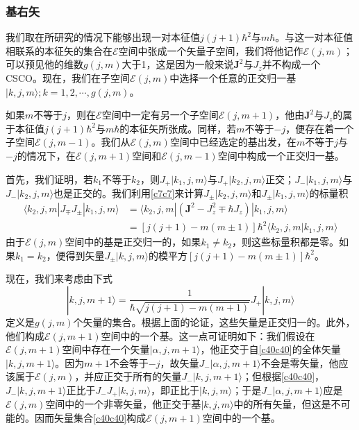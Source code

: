 \documentclass[]{article}
\begin{document}
\subsubsection{基右矢}
我们取在所研究的情况下能够出现一对本征值$j(j+1)\hbar^2$与$m\hbar$。与这一对本征值相联系的本征矢的集合在$\mathscr{E}$空间中张成一个矢量子空间，我们将他记作$\mathscr{E}(j,m)$；可以预见他的维数$g(j,m)$大于1，这是因为一般来说$\boldsymbol{J}^2$与$J_z$并不构成一个CSCO。现在，我们在子空间$\mathscr{E}(j,m)$中选择一个任意的正交归一基${|k,j,m\rangle;k=1,2,\cdots,g(j,m)}$。\par 
如果$m$不等于$j$，则在$\mathscr{E}$空间中一定有另一个子空间$\mathscr{E}(j,m+1)$，他由$\boldsymbol{J}^2$与$J_z$的属于本征值$j(j+1)\hbar^2$与$m\hbar$的本征矢所张成。同样，若$m$不等于$-j$，便存在着一个子空间$\mathscr{E}(j,m-1)$。我们从$\mathscr{E}(j,m)$空间中已经选定的基出发，在$m$不等于$j$与$-j$的情况下，在$\mathscr{E}(j,m+1)$空间和$\mathscr{E}(j,m-1)$空间中构成一个正交归一基。\par 
首先，我们证明，若$k_1$不等于$k_2$，则$J_+|k_1,j,m\rangle$与$J_+|k_2,j,m\rangle$正交；$J_-|k_1,j,m\rangle$与$J_-|k_2,j,m\rangle$也是正交的。我们利用\eqref{c7c7}来计算$J_{\pm}|k_2,j,m\rangle$和$J_{\pm}|k_1,j,m\rangle$的标量积
\begin{align}
	\langle k_2,j,m|J_{\mp}J_{\pm}|k_1,j,m\rangle&=\langle k_2,j,m|(\boldsymbol{J}^2-J_z^2\mp\hbar J_z)|k_1,j,m\rangle\nonumber\\
	&=[j(j+1)-m(m\pm1)]\hbar^2\langle k_2,j,m|k_1,j,m\rangle
\end{align}
由于$\mathscr{E}(j,m)$空间中的基是正交归一的，如果$k_1\neq k_2$，则这些标量积都是零。如果$k_1=k_2$，便得到矢量$J_{\pm}|k,j,m\rangle$的模平方$[j(j+1)-m(m\pm1)]\hbar^2$。\par 
现在，我们来考虑由下式
\begin{equation}
	|k,j,m+1\rangle=\dfrac{1}{\hbar\sqrt{j(j+1)-m(m+1)}}J_+|k,j,m\rangle
	\label{c40c40}
\end{equation}
定义是$g(j,m)$个矢量的集合。根据上面的论证，这些矢量是正交归一的。此外，他们构成$\mathscr{E}(j,m+1)$空间中的一个基。这一点可证明如下：我们假设在$\mathscr{E}(j,m+1)$空间中存在一个矢量$|\alpha,j,m+1\rangle$，他正交于自\eqref{c40c40}的全体矢量$|k,j,m+1\rangle$。因为$m+1$不会等于$-j$，故矢量$J_-|\alpha,j,m+1\rangle$不会是零矢量，他应该属于$\mathscr{E}(j,m)$，并应正交于所有的矢量$J_-|k,j,m+1\rangle$；但根据\eqref{c40c40}，$J_-|k,j,m+1\rangle$正比于$J_-J_+|k,j,m\rangle$，即正比于$|k,j,m\rangle$；于是$J_-|\alpha,j,m+1\rangle$应是$\mathscr{E}(j,m)$空间中的一个非零矢量，他正交于基${|k,j,m\rangle}$中的所有矢量，但这是不可能的。因而矢量集合\eqref{c40c40}构成$\mathscr{E}(j,m+1)$空间中的一个基。\par 
\end{document}
